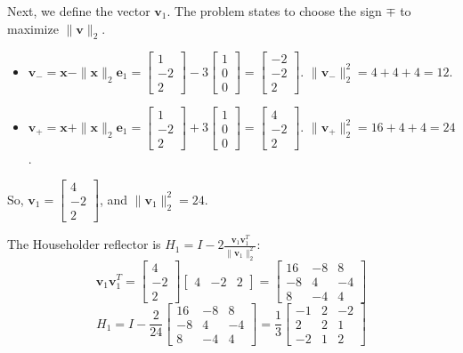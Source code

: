 \documentclass{article}
\newcommand{\0}{{\mathbf{0}}} %
\newcommand{\vect}[1]{\mathbf{#1}}
\begin{document}
Next, we define the vector $\vect{v}_1$. The problem states to choose the sign $\mp$ to maximize $\|\vect{v}\|_2$.
\begin{itemize}
\item $\vect{v}_- = \vect{x} - \|\vect{x}\|_2\vect{e}_1 =
\begin{bmatrix} 1 \\ -2 \\ 2
\end{bmatrix} - 3
\begin{bmatrix} 1 \\ 0 \\ 0
\end{bmatrix} =
\begin{bmatrix} -2 \\ -2 \\ 2
\end{bmatrix}$. $\|\vect{v}_-\|_2^2 = 4+4+4 = 12$.
\item $\vect{v}_+ = \vect{x} + \|\vect{x}\|_2\vect{e}_1 =
\begin{bmatrix} 1 \\ -2 \\ 2
\end{bmatrix} + 3
\begin{bmatrix} 1 \\ 0 \\ 0
\end{bmatrix} =
\begin{bmatrix} 4 \\ -2 \\ 2
\end{bmatrix}$. $\|\vect{v}_+\|_2^2 = 16+4+4 = 24$.
\end{itemize}
So, $\vect{v}_1 =
\begin{bmatrix} 4 \\ -2 \\ 2
\end{bmatrix}$, and $\|\vect{v}_1\|_2^2 = 24$.

The Householder reflector is $H_1 = I - 2 \frac{\vect{v}_1 \vect{v}_1^T}{\|\vect{v}_1\|_2^2}$:
$$ \vect{v}_1 \vect{v}_1^T =
\begin{bmatrix} 4 \\ -2 \\ 2
\end{bmatrix}
\begin{bmatrix} 4 & -2 & 2
\end{bmatrix} =
\begin{bmatrix} 16 & -8 & 8 \\ -8 & 4 & -4 \\ 8 & -4 & 4
\end{bmatrix} $$
$$ H_1 = I - \frac{2}{24}
\begin{bmatrix} 16 & -8 & 8 \\ -8 & 4 & -4 \\ 8 & -4 & 4
\end{bmatrix} =\frac{1}{3}
\begin{bmatrix} -1 & 2 & -2 \\ 2 & 2 & 1 \\ -2 & 1 & 2
\end{bmatrix} $$
\end{document}
